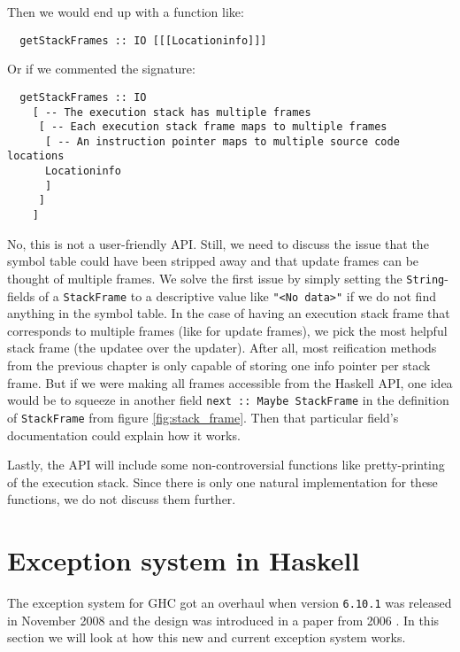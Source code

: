 Then we would end up with a function like:

\begin{verbatim}
  getStackFrames :: IO [[[Locationinfo]]]
\end{verbatim}

Or if we commented the signature:

\begin{verbatim}
  getStackFrames :: IO
    [ -- The execution stack has multiple frames
     [ -- Each execution stack frame maps to multiple frames
      [ -- An instruction pointer maps to multiple source code locations
      Locationinfo
      ]
     ]
    ]
\end{verbatim}

No, this is not a user-friendly API. Still, we need to discuss the issue
that the symbol table could have been stripped away and that update
frames can be thought of multiple frames. We solve the first issue by
simply setting the \texttt{String}-fields of a \texttt{StackFrame} to
a descriptive value like \texttt{"<No data>"} if we do not find anything
in the symbol table. In the case of having an
execution stack frame that corresponds to multiple
frames (like for update frames), we pick the most helpful stack frame
(the updatee over the updater).
After all, most reification methods from the previous chapter is only
capable of storing one info pointer per stack frame. But if we were
making all frames accessible from the Haskell API, one idea would be
to squeeze in another field \texttt{next :: Maybe StackFrame} in the
definition of \texttt{StackFrame} from figure \ref{fig:stack_frame}.
Then that particular field's documentation could explain how it works.

Lastly, the API will include some non-controversial functions like
pretty-printing of the execution stack.  Since there is only one natural
implementation for these functions, we do not discuss them further.

\section{Exception system in Haskell}

The exception system for GHC got an overhaul when
version \texttt{6.10.1} was released in November 2008
\cite{haskell_org_release_6.10.1} and the design was introduced in a paper
from 2006 \cite{marlow2006extensible}. In this section we will
look at how this new and current exception system works.

